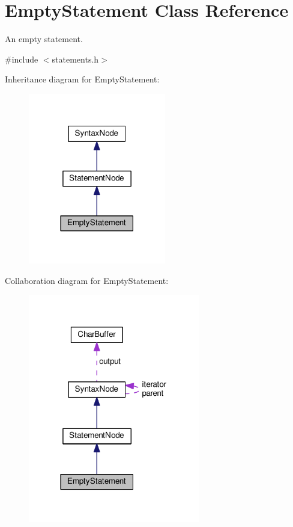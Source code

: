 \hypertarget{classEmptyStatement}{}\section{Empty\+Statement Class Reference}
\label{classEmptyStatement}


An empty statement.  




{\ttfamily \#include $<$statements.\+h$>$}



Inheritance diagram for Empty\+Statement\+:\nopagebreak
\begin{figure}[H]
\begin{center}
\leavevmode
\includegraphics[width=170pt]{classEmptyStatement__inherit__graph}
\end{center}
\end{figure}


Collaboration diagram for Empty\+Statement\+:\nopagebreak
\begin{figure}[H]
\begin{center}
\leavevmode
\includegraphics[width=213pt]{classEmptyStatement__coll__graph}
\end{center}
\end{figure}
